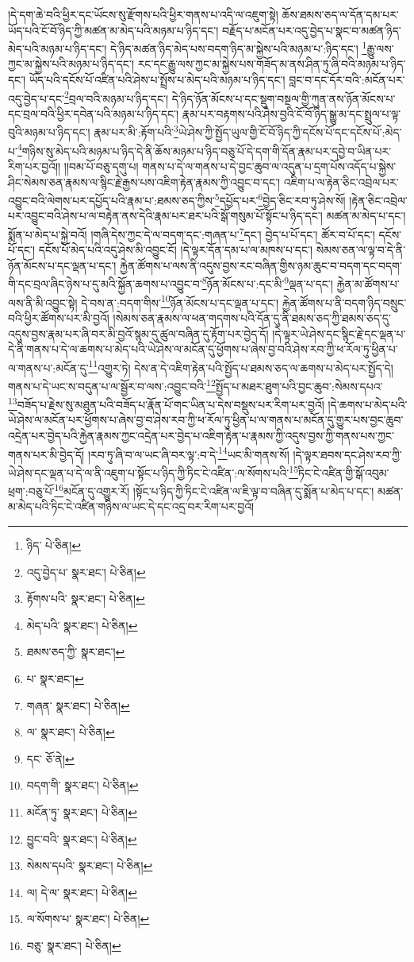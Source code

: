 །དེ་དག་ཆེ་བའི་ཕྱིར་དང་ཡོངས་སུ་རྫོགས་པའི་ཕྱིར་གནས་པ་འདི་ལ་འཇུག་སྟེ། ཆོས་ཐམས་ཅད་ལ་དོན་དམ་པར་ཡོད་པའི་ངོ་བོ་ཉིད་ཀྱི་མཚན་མ་མེད་པའི་མཉམ་པ་ཉིད་དང་། བརྗོད་པ་མངོན་པར་འདུ་བྱེད་པ་སྣང་བ་མཚན་ཉིད་མེད་པའི་མཉམ་པ་ཉིད་དང་། དེ་ཉིད་མཚན་ཉིད་མེད་པས་བདག་ཉིད་མ་སྐྱེས་པའི་མཉམ་པ་:ཉིད་དང་། \footnote{ཉིད་  པེ་ཅིན། }རྒྱུ་ལས་ཀྱང་མ་སྐྱེས་པའི་མཉམ་པ་ཉིད་དང་། རང་དང་རྒྱུ་ལས་ཀྱང་མ་སྐྱེས་པས་གཟོད་མ་ནས་ཤིན་ཏུ་ཞི་བའི་མཉམ་པ་ཉིད་དང་། ཡོད་པའི་དངོས་པོ་འཛིན་པའི་ཤེས་པ་སྤྲོས་པ་མེད་པའི་མཉམ་པ་ཉིད་དང་། བླང་བ་དང་དོར་བའི་:མངོན་པར་འདུ་བྱེད་པ་དང་\footnote{འདུ་བྱེད་པ་  སྣར་ཐང་།  པེ་ཅིན། }བྲལ་བའི་མཉམ་པ་ཉིད་དང་། དེ་ཉིད་ཉོན་མོངས་པ་དང་སྡུག་བསྔལ་གྱི་ཀུན་ནས་ཉོན་མོངས་པ་དང་བྲལ་བའི་ཕྱིར་དབེན་པའི་མཉམ་པ་ཉིད་དང་། རྣམ་པར་བརྟགས་པའི་ཤེས་བྱའི་ངོ་བོ་ཉིད་སྒྱུ་མ་དང་སྤྲུལ་པ་ལྟ་བུའི་མཉམ་པ་ཉིད་དང་། རྣམ་པར་མི་:རྟོག་པའི་\footnote{རྟོགས་པའི་  སྣར་ཐང་།  པེ་ཅིན། }ཡེ་ཤེས་ཀྱི་སྤྱོད་ཡུལ་གྱི་ངོ་བོ་ཉིད་ཀྱི་དངོས་པོ་དང་དངོས་པོ་:མེད་པ་\footnote{མེད་པའི་  སྣར་ཐང་།  པེ་ཅིན། }གཉིས་སུ་མེད་པའི་མཉམ་པ་ཉིད་དེ་ནི་ཆོས་མཉམ་པ་ཉིད་བཅུ་པོ་དེ་དག་གི་དོན་རྣམ་པར་དབྱེ་བ་ཡིན་པར་རིག་པར་བྱའོ།། །།བམ་པོ་བཅུ་དགུ་པ། གནས་པ་དེ་ལ་གནས་པ་དེ་བྱང་ཆུབ་ལ་འདུན་པ་དྲག་པོས་འདོད་པ་སྐྱེས་ཤིང་སེམས་ཅན་རྣམས་ལ་སྙིང་རྗེ་རྒྱས་པས་འཇིག་རྟེན་རྣམས་ཀྱི་འབྱུང་བ་དང་། འཇིག་པ་ལ་རྟེན་ཅིང་འབྲེལ་པར་འབྱུང་བའི་ལེགས་པར་དཔྱོད་པའི་རྣམ་པ་:ཐམས་ཅད་ཀྱིས་\footnote{ཐམས་ཅད་ཀྱི་  སྣར་ཐང་། }དཔྱོད་པར་\footnote{པ་  སྣར་ཐང་། }བྱེད་ཅིང་རབ་ཏུ་ཤེས་སོ། །རྟེན་ཅིང་འབྲེལ་པར་འབྱུང་བའི་ཤེས་པ་ལ་བརྟེན་ནས་དེའི་རྣམ་པར་ཐར་པའི་སྒོ་གསུམ་པོ་སྟོང་པ་ཉིད་དང་། མཚན་མ་མེད་པ་དང་། སྨོན་པ་མེད་པ་སྐྱེ་བའོ། །གཞི་དེས་ཀྱང་དེ་ལ་བདག་དང་:གཞན་པ་\footnote{གཞན་  སྣར་ཐང་།  པེ་ཅིན། }དང་། བྱེད་པ་པོ་དང་། ཚོར་བ་པོ་དང་། དངོས་པོ་དང་། དངོས་པོ་མེད་པའི་འདུ་ཤེས་མི་འབྱུང་ངོ། །དེ་ལྟར་དོན་དམ་པ་ལ་མཁས་པ་དང་། སེམས་ཅན་ལ་ལྟ་བ་དེ་ནི་ཉོན་མོངས་པ་དང་ལྡན་པ་དང་། རྐྱེན་ཚོགས་པ་ལས་ནི་འདུས་བྱས་རང་བཞིན་གྱིས་ཉམ་ཆུང་བ་བདག་དང་བདག་གི་དང་བྲལ་ཞིང་ཉེས་པ་དུ་མའི་སྐྱོན་ཆགས་པ་འབྱུང་བ་\footnote{ལ་  སྣར་ཐང་།  པེ་ཅིན། }ཉོན་མོངས་པ་:དང་མི་\footnote{དང་  ཅོ་ནེ། }ལྡན་པ་དང་། རྐྱེན་མ་ཚོགས་པ་ལས་ནི་མི་འབྱུང་སྟེ། དེ་བས་ན་:བདག་གིས་\footnote{བདག་གི་  སྣར་ཐང་།  པེ་ཅིན། }ཉོན་མོངས་པ་དང་ལྡན་པ་དང་། རྐྱེན་ཚོགས་པ་ནི་བདག་ཉིད་བསྲུང་བའི་ཕྱིར་ཚོགས་པར་མི་བྱའོ། །སེམས་ཅན་རྣམས་ལ་ཕན་གདགས་པའི་དོན་དུ་ནི་ཐམས་ཅད་ཀྱི་ཐམས་ཅད་དུ་འདུས་བྱས་རྣམ་པར་ཞི་བར་མི་བྱའོ་སྙམ་དུ་ཚུལ་བཞིན་དུ་རྟོག་པར་བྱེད་དོ། །དེ་ལྟར་ཡེ་ཤེས་དང་སྙིང་རྗེ་དང་ལྡན་པ་དེ་ནི་གནས་པ་དེ་ལ་ཆགས་པ་མེད་པའི་ཡེ་ཤེས་ལ་མངོན་དུ་ཕྱོགས་པ་ཞེས་བྱ་བའི་ཤེས་རབ་ཀྱི་ཕ་རོལ་ཏུ་ཕྱིན་པ་ལ་གནས་པ་:མངོན་དུ་\footnote{མངོན་ཏུ་  སྣར་ཐང་།  པེ་ཅིན། }འགྱུར་ཏེ། དེས་ན་དེ་འཇིག་རྟེན་པའི་སྤྱོད་པ་ཐམས་ཅད་ལ་ཆགས་པ་མེད་པར་སྤྱོད་དེ། གནས་པ་དེ་ཡང་ས་བདུན་པ་ལ་སྦྱོར་བ་ལས་:འབྱུང་བའི་\footnote{བྱུང་བའི་  སྣར་ཐང་།  པེ་ཅིན། }སྤྱོད་པ་མཐར་ཐུག་པའི་བྱང་ཆུབ་:སེམས་དཔའ་\footnote{སེམས་དཔའི་  སྣར་ཐང་།  པེ་ཅིན། }བཟོད་པ་རྗེས་སུ་མཐུན་པའི་བཟོད་པ་རྣོན་པོ་གང་ཡིན་པ་དེས་བསྡུས་པར་རིག་པར་བྱའོ། །དེ་ཆགས་པ་མེད་པའི་ཡེ་ཤེས་ལ་མངོན་པར་ཕྱོགས་པ་ཞེས་བྱ་བ་ཤེས་རབ་ཀྱི་ཕ་རོལ་ཏུ་ཕྱིན་པ་ལ་གནས་པ་མངོན་དུ་གྱུར་པས་བྱང་ཆུབ་འདྲེན་པར་བྱེད་པའི་རྐྱེན་རྣམས་ཀྱང་འདྲེན་པར་བྱེད་པ་འཇིག་རྟེན་པ་རྣམས་ཀྱི་འདུས་བྱས་ཀྱི་གནས་པས་ཀྱང་གནས་པར་མི་བྱེད་དོ། །རབ་ཏུ་ཞི་བ་ལ་ཡང་ཞི་བར་ལྟ་:བ་དེ་\footnote{ལ། དེ་ལ་  སྣར་ཐང་།  པེ་ཅིན། }ཡང་མི་གནས་སོ། །དེ་ལྟར་ཐབས་དང་ཤེས་རབ་ཀྱི་ཡེ་ཤེས་དང་ལྡན་པ་དེ་ལ་ནི་འཇུག་པ་སྟོང་པ་ཉིད་ཀྱི་ཏིང་ངེ་འཛིན་:ལ་སོགས་པའི་\footnote{ལ་སོགས་པ་  སྣར་ཐང་།  པེ་ཅིན། }ཏིང་ངེ་འཛིན་གྱི་སྒོ་འབུམ་ཕྲག་:བཅུ་པོ་\footnote{བཅུ་  སྣར་ཐང་།  པེ་ཅིན། }མངོན་དུ་འགྱུར་རོ། །སྟོང་པ་ཉིད་ཀྱི་ཏིང་ངེ་འཛིན་ལ་ཇི་ལྟ་བ་བཞིན་དུ་སྨོན་པ་མེད་པ་དང་། མཚན་མ་མེད་པའི་ཏིང་ངེ་འཛིན་གཉིས་ལ་ཡང་དེ་དང་འདྲ་བར་རིག་པར་བྱའོ། 